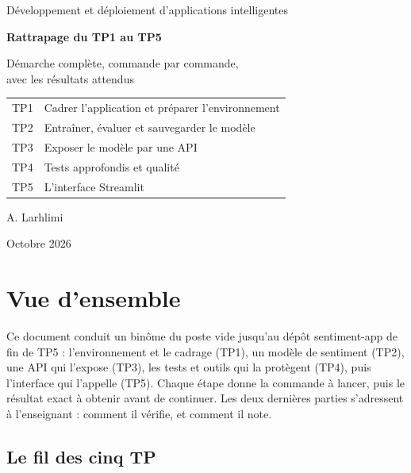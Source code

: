 \documentclass[11pt,a4paper]{article}
\newcommand{\co}[1]{{\ttfamily\hyphenchar\font=45\relax #1}}
\begin{document}
\begin{titlepage}
\centering
\vspace*{2.5cm}
{\large Développement et déploiement d'applications intelligentes\par}
\vspace{1.8cm}
{\Huge\bfseries Rattrapage du TP1 au TP5\par}
\vspace{0.6cm}
{\Large Démarche complète, commande par commande,\\ avec les résultats attendus\par}
\vspace{1.6cm}
\begin{tabular}{@{}ll@{}}
\toprule
TP1 & Cadrer l'application et préparer l'environnement \\
TP2 & Entraîner, évaluer et sauvegarder le modèle \\
TP3 & Exposer le modèle par une API \\
TP4 & Tests approfondis et qualité \\
TP5 & L'interface Streamlit \\
\bottomrule
\end{tabular}
\vfill
{\large A. Larhlimi\par}
\vspace{0.3cm}
{\large Octobre 2026\par}
\end{titlepage}

\tableofcontents
\newpage

\section{Vue d'ensemble}

Ce document conduit un binôme du poste vide jusqu'au dépôt \co{sentiment-app} de fin de TP5 :
l'environnement et le cadrage (TP1), un modèle de sentiment (TP2), une API qui l'expose (TP3), les tests et
outils qui la protègent (TP4), puis l'interface qui l'appelle (TP5). Chaque étape donne la commande à lancer, puis le résultat exact à
obtenir avant de continuer. Les deux dernières parties s'adressent à l'enseignant : comment il vérifie, et
comment il note.

\subsection{Le fil des cinq TP}
\end{document}
